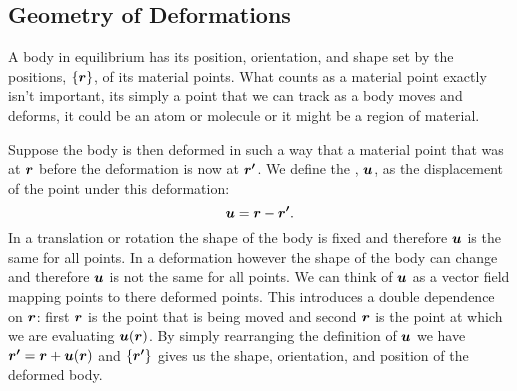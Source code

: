 \documentclass[a4paper]{article}
\begin{document}
    \subsection{Geometry of Deformations}
    A body in equilibrium has its position, orientation, and shape set by the positions, \(\{\bm{r}\}\), of its material points.
    What counts as a material point exactly isn't important, its simply a point that we can track as a body moves and deforms, it could be an atom or molecule or it might be a region of material.
    
    Suppose the body is then deformed in such a way that a material point that was at \(\bm{r}\) before the deformation is now at \(\bm{r'}\).
    We define the , \(\bm{u}\), as the displacement of the point under this deformation:
    \[\bm{u} = \bm{r} - \bm{r'}.\]
    In a translation or rotation the shape of the body is fixed and therefore \(\bm{u}\) is the same for all points.
    In a deformation however the shape of the body can change and therefore \(\bm{u}\) is not the same for all points.
    We can think of \(\bm{u}\) as a vector field mapping points to there deformed points.
    This introduces a double dependence on \(\bm{r}\): first \(\bm{r}\) is the point that is being moved and second \(\bm{r}\) is the point at which we are evaluating \(\bm{u}(\bm{r})\).
    By simply rearranging the definition of \(\bm{u}\) we have \(\bm{r'} = \bm{r} + \bm{u}(\bm{r})\) and \(\{\bm{r'}\}\) gives us the shape, orientation, and position of the deformed body.
    
\end{document}
